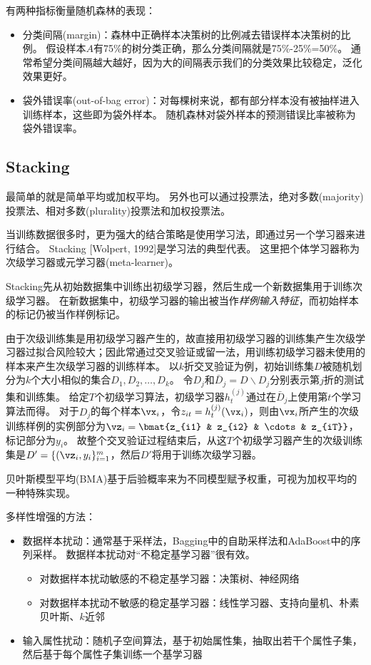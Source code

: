 有两种指标衡量随机森林的表现：
\begin{itemize}
	\item 分类间隔(margin)：森林中正确样本决策树的比例减去错误样本决策树的比例。
	假设样本$A$有75\%的树分类正确，那么分类间隔就是75\%-25\%=50\%。
	通常希望分类间隔越大越好，因为大的间隔表示我们的分类效果比较稳定，泛化效果更好。
	\item 袋外错误率(out-of-bag error)：对每棵树来说，都有部分样本没有被抽样进入训练样本，这些即为袋外样本。
	随机森林对袋外样本的预测错误比率被称为袋外错误率。
\end{itemize}

\subsection{Stacking}
最简单的就是简单平均或加权平均。
另外也可以通过投票法，绝对多数(majority)投票法、相对多数(plurality)投票法和加权投票法。

当训练数据很多时，更为强大的结合策略是使用学习法，即通过另一个学习器来进行结合。
Stacking [Wolpert, 1992]是学习法的典型代表。
这里把个体学习器称为次级学习器或元学习器(meta-learner)。

Stacking先从初始数据集中训练出初级学习器，然后生成一个新数据集用于训练次级学习器。
在新数据集中，初级学习器的输出被当作\emph{样例输入特征}，而初始样本的标记仍被当作样例标记。

由于次级训练集是用初级学习器产生的，故直接用初级学习器的训练集产生次级学习器过拟合风险较大；因此常通过交叉验证或留一法，用训练初级学习器未使用的样本来产生次级学习器的训练样本。
以$k$折交叉验证为例，初始训练集$D$被随机划分为$k$个大小相似的集合$D_1,D_2,\ldots,D_k$。
令$D_j$和$\bar{D}_j=D\backslash D_j$分别表示第$j$折的测试集和训练集。
给定$T$个初级学习算法，初级学习器$h_t^{(j)}$通过在$\bar{D}_j$上使用第$t$个学习算法而得。
对于$D_j$的每个样本$\vx_i$，令$z_{it}=h_t^{(j)}(\vx_i)$，则由$\vx_i$所产生的次级训练样例的实例部分为$\vz_i=\bmat{z_{i1} & z_{i2} & \cdots & z_{iT}}$，标记部分为$y_i$。
故整个交叉验证过程结束后，从这$T$个初级学习器产生的次级训练集是$D'=\{(\vz_i,y_i\}_{i=1}^m$，然后$D'$将用于训练次级学习器。

贝叶斯模型平均(BMA)基于后验概率来为不同模型赋予权重，可视为加权平均的一种特殊实现。

多样性增强的方法：
\begin{itemize}
	\item 数据样本扰动：通常基于采样法，Bagging中的自助采样法和AdaBoost中的序列采样。
	数据样本扰动对“不稳定基学习器”很有效。
	\begin{itemize}
		\item 对数据样本扰动敏感的不稳定基学习器：决策树、神经网络
		\item 对数据样本扰动不敏感的稳定基学习器：线性学习器、支持向量机、朴素贝叶斯、$k$近邻
	\end{itemize}
	\item 输入属性扰动：随机子空间算法，基于初始属性集，抽取出若干个属性子集，然后基于每个属性子集训练一个基学习器
\end{itemize}